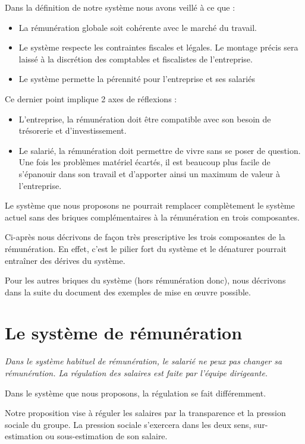 \documentclass[12pt]{article}
\newcommand{\actuel}[1]{%
  \textit{#1}
}
\begin{document}
 Dans la définition de notre système nous avons veillé à ce que :
 \begin{itemize}
   \item La rémunération globale soit cohérente avec le marché du travail.
   \item Le système respecte les contraintes fiscales et légales. Le montage précis sera  laissé à la discrétion des comptables et fiscalistes de l’entreprise.
   \item Le système permette la pérennité pour l’entreprise et ses salariés
 \end{itemize}

 Ce dernier point implique 2 axes de réflexions :  
 \begin{itemize}
    \item L’entreprise, la rémunération doit être compatible avec son besoin de trésorerie et d’investissement.
    \item Le salarié, la rémunération doit permettre de vivre sans se poser de question. Une fois les problèmes matériel écartés, il est beaucoup plus facile de s’épanouir dans son travail et d'apporter ainsi un maximum de valeur à l’entreprise.
 \end{itemize}

 Le système que nous proposons ne pourrait remplacer complètement le système actuel sans des briques complémentaires à la rémunération en trois composantes. 

 Ci-après nous décrivons de façon très prescriptive les trois composantes de la rémunération. En effet, c'est le pilier fort du système et le dénaturer pourrait entraîner des dérives du système. 
 
 Pour les autres briques du système (hors rémunération donc), nous décrivons dans la suite du document des exemples de mise en œuvre possible. 

\section{Le système de rémunération}
  \actuel{Dans le système habituel de rémunération, le salarié ne peux pas changer sa rémunération. La régulation des salaires est faite par l’équipe dirigeante.}

 Dans le système que nous proposons, la régulation se fait différemment. 

 Notre proposition vise à réguler les salaires par la transparence et la pression sociale du groupe. La pression sociale s’exercera dans les deux sens, sur-estimation ou sous-estimation de son salaire. 
\end{document}
